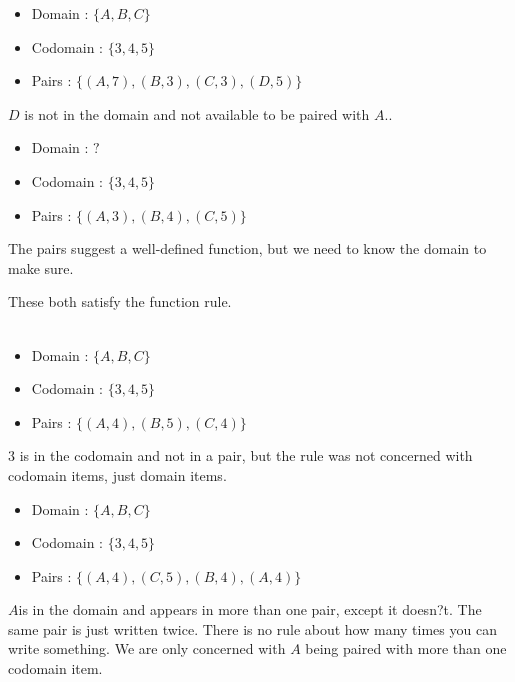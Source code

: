 \documentclass{ximera}
\begin{document}
\begin{question}
\begin{itemize}
\item Domain : $\{ A, B, C \}$
\item Codomain : $\{ 3, 4, 5 \}$
\item Pairs : $\{ (A, 7), (B, 3), (C, 3), (D, 5) \}$
\end{itemize}

\begin{multipleChoice}
\end{multipleChoice}
\begin{feedback}
$D$ is not in the domain and not available to be paired with $A$..
\end{feedback}
\end{question}


\begin{question}
\begin{itemize}
\item Domain : $?$
\item Codomain : $\{ 3, 4, 5 \}$
\item Pairs : $\{ (A, 3), (B, 4), (C, 5) \}$
\end{itemize}

\begin{multipleChoice}
\end{multipleChoice}
\begin{feedback}
The pairs suggest a well-defined function, but we need to know the domain to make sure.
\end{feedback}
\end{question}



\begin{example}
These both satisfy the function rule. \\
\quad \\
\begin{itemize}
\item Domain : $\{ A, B, C \}$
\item Codomain : $\{ 3, 4, 5 \}$
\item Pairs : $\{ (A, 4), (B, 5), (C, 4) \}$
\end{itemize}
$3$ is in the codomain and not in a pair, but the rule was not concerned with codomain items, just domain items.

\begin{itemize}
\item Domain : $\{ A, B, C \}$
\item Codomain : $\{ 3, 4, 5 \}$
\item Pairs : $\{ (A, 4), (C, 5) , (B, 4), (A, 4) \}$
\end{itemize}
$A $is in the domain and appears in more than one pair, except it doesn?t. The same pair is just written twice.  There is no rule about how many times you can write something.  We are only concerned with $A$ being paired with more than one codomain item.
\end{example}
\quad \\
\end{document}
